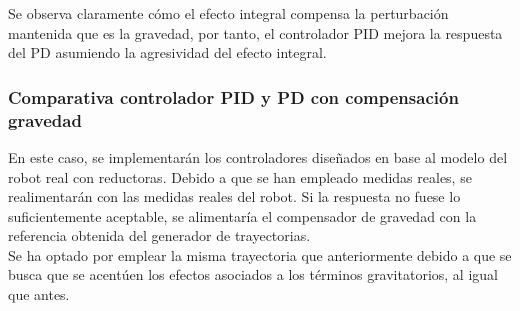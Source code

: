 Se observa claramente cómo el efecto integral compensa la perturbación mantenida que es la gravedad, por tanto, el controlador PID mejora la respuesta del PD asumiendo la agresividad del efecto integral.



\newpage

\subsubsection{Comparativa controlador PID y PD con compensación gravedad}

En este caso, se implementarán los controladores diseñados en base al modelo del robot real con reductoras. Debido a que se han empleado medidas reales, se realimentarán con las medidas reales del robot. Si la respuesta no fuese lo suficientemente aceptable, se alimentaría el compensador de gravedad con la referencia obtenida del generador de trayectorias. \\

Se ha optado por emplear la misma trayectoria que anteriormente debido a que se busca que se acentúen los efectos asociados a los términos gravitatorios, al igual que antes.\\

